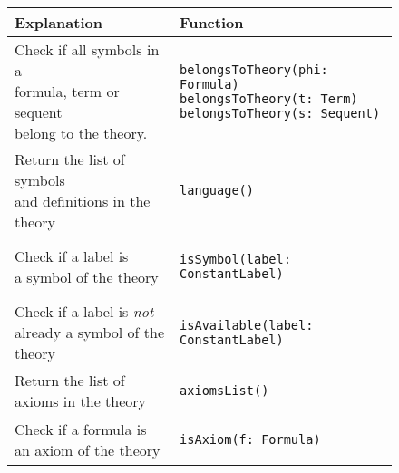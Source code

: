 {\begin{figure}[hp]
\begin{center}
      \label{fig:theorysetters}
    \end{center}
  \end{figure}

  \iffalse
  \begin{figure}[hp]
    \begin{center}
      \begin{tabular}{l|l}
        Explanation & Function
        \\ \hline

        \makecell[l]{Check if all symbols in a        \\formula, term or sequent\\belong to the theory.} &
            \begin{lstlisting}
belongsToTheory(phi: Formula)
belongsToTheory(t: Term)
belongsToTheory(s: Sequent)
\end{lstlisting}
        \\ %

        \makecell[l]{Return the list of symbols       \\and definitions in the theory} &
            \begin{lstlisting}
language()
\end{lstlisting}
        \\ %

        \makecell[l]{Check if a label is              \\a symbol of the theory} &
            \begin{lstlisting}
isSymbol(label: ConstantLabel)
\end{lstlisting}
        \\ %

        \makecell[l]{Check if a label is \textit{not} \\already a symbol of the theory} &
            \begin{lstlisting}
isAvailable(label: ConstantLabel)
\end{lstlisting}
        \\ %

        \makecell[l]{Return the list of               \\axioms in the theory} &
            \begin{lstlisting}
axiomsList()
\end{lstlisting}
        \\ %

        \makecell[l]{Check if a formula is            \\an axiom of the theory} &
            \begin{lstlisting}
isAxiom(f: Formula)
\end{lstlisting}
        \\ %


\end{tabular}
\end{center}
\end{figure}}
